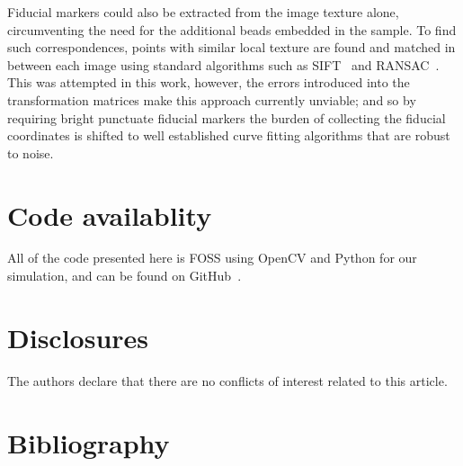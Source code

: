 \documentclass{osa-article}
\begin{document}
Fiducial markers could also be extracted from the image texture alone, circumventing the need for the additional beads embedded in the sample.
To find such correspondences, points with similar local texture are found and matched in between each image using standard algorithms such as SIFT~\cite{loweObjectRecognitionLocal1999} and RANSAC~\cite{fischlerRandomSampleConsensus1981}. %
This was attempted in this work, however, the errors introduced into the transformation matrices make this approach currently unviable; and so by requiring bright punctuate fiducial markers the burden of collecting the fiducial coordinates is shifted to well established curve fitting algorithms that are robust to noise.


\section*{Code availablity}
All of the code presented here is FOSS using OpenCV and Python for our simulation, and can be found on GitHub~\cite{craig_russell_2020_4073437}.

\section*{Disclosures}
The authors declare that there are no conflicts of interest related to this article.

\section*{Bibliography}
% 
% 


\onecolumn
\newpage
%
\end{document}
